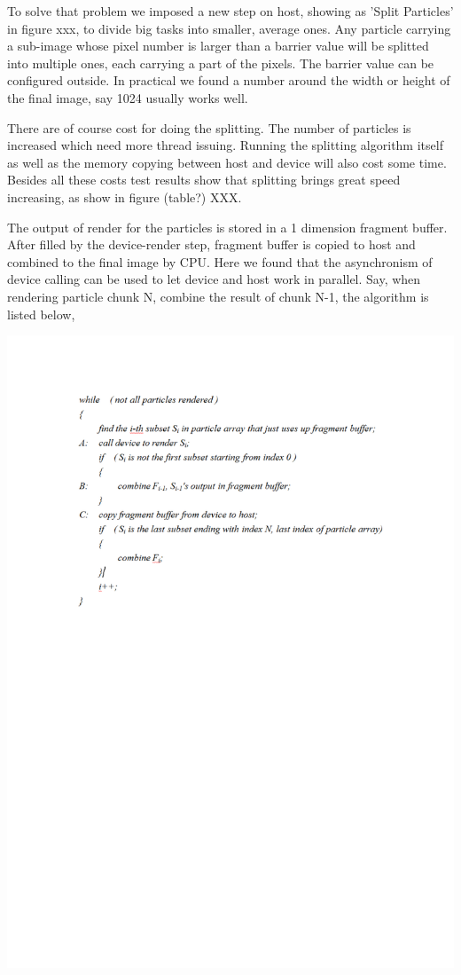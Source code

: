 To solve that problem we imposed a new step on host, showing as 'Split Particles' in figure xxx, to divide big tasks into smaller, average ones. Any particle carrying a sub-image whose pixel number is larger than a barrier value will be splitted into multiple ones, each carrying a part of the pixels. The barrier value can be configured outside. In practical we found a number around the width or height of the final image, say 1024 usually works well.

There are of course cost for doing the splitting. The number of particles is increased which need more thread issuing. Running the splitting algorithm itself as well as the memory copying between host and device will also cost some time. Besides all these costs test results show that splitting brings great speed increasing, as show in figure (table?) XXX.

The output of render for the particles is stored in a 1 dimension fragment buffer. After filled by the device-render step, fragment buffer is copied to host and combined to the final image by CPU. Here we found that the asynchronism of device calling can be used to let device and host work in parallel. Say, when rendering particle chunk N, combine the result of chunk N-1, the algorithm is listed below,

\includegraphics[width=1.2\textwidth]{cuda_code.pdf}


